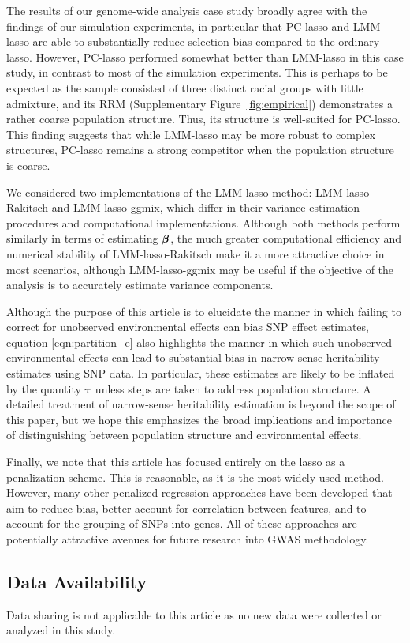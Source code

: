 
The results of our genome-wide analysis case study broadly agree with the findings of our simulation experiments, in particular that PC-lasso and LMM-lasso are able to substantially reduce selection bias compared to the ordinary lasso. However, PC-lasso performed somewhat better than LMM-lasso in this case study, in contrast to most of the simulation experiments. This is perhaps to be expected as the sample consisted of three distinct racial groups with little admixture, and its RRM (Supplementary Figure~\ref{fig:empirical}) demonstrates a rather coarse population structure. Thus, its structure is well-suited for PC-lasso. This finding suggests that while LMM-lasso may be more robust to complex structures, PC-lasso remains a strong competitor when the population structure is coarse.

We considered two implementations of the LMM-lasso method: LMM-lasso-Rakitsch and LMM-lasso-ggmix, which differ in their variance estimation procedures and computational implementations. Although both methods perform similarly in terms of estimating $\boldsymbol{\beta}{}$, the much greater computational efficiency and numerical stability of LMM-lasso-Rakitsch make it a more attractive choice in most scenarios, although LMM-lasso-ggmix may be useful if the objective of the analysis is to accurately estimate variance components.

Although the purpose of this article is to elucidate the manner in which failing to correct for unobserved environmental effects can bias SNP effect estimates, equation \eqref{eqn:partition_e} also highlights the manner in which such unobserved environmental effects can lead to substantial bias in narrow-sense heritability estimates using SNP data. In particular, these estimates are likely to be inflated by the quantity $\boldsymbol{\tau}$ unless steps are taken to address population structure. A detailed treatment of narrow-sense heritability estimation is beyond the scope of this paper, but we hope this emphasizes the broad implications and importance of distinguishing between population structure and environmental effects.

Finally, we note that this article has focused entirely on the lasso as a penalization scheme. This is reasonable, as it is the most widely used method. However, many other penalized regression approaches have been developed that aim to reduce bias, better account for correlation between features, and to account for the grouping of SNPs into genes. All of these approaches are potentially attractive avenues for future research into GWAS methodology.

\subsection*{Data Availability}

Data sharing is not applicable to this article as no new data were collected or analyzed in this study.
